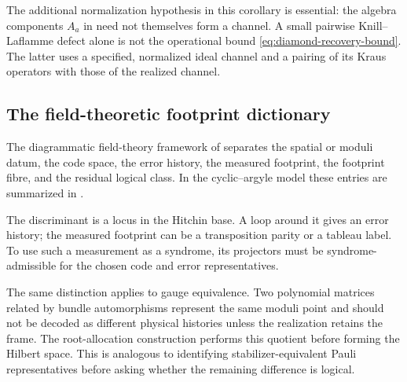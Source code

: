 \documentclass[11pt]{article}
\theoremstyle{definition}
\theoremstyle{remark}
\begin{document}
The additional normalization hypothesis in this corollary is essential: the algebra components $A_a$ in  need not themselves form a channel.  A small pairwise Knill--Laflamme defect alone is not the operational bound \eqref{eq:diamond-recovery-bound}.  The latter uses a specified, normalized ideal channel and a pairing of its Kraus operators with those of the realized channel.

\subsection{The field-theoretic footprint dictionary}\label{sec:dictionary}

The diagrammatic field-theory framework of \cite{RayanDiagrammatic2026} separates the spatial or moduli datum, the code space, the error history, the measured footprint, the footprint fibre, and the residual logical class.  In the cyclic--argyle model these entries are summarized in .

The discriminant is a locus in the Hitchin base.  A loop around it gives an error history; the measured footprint can be a transposition parity or a tableau label.  To use such a measurement as a syndrome, its projectors must be syndrome-admissible for the chosen code and error representatives.

The same distinction applies to gauge equivalence.  Two polynomial matrices related by bundle automorphisms represent the same moduli point and should not be decoded as different physical histories unless the realization retains the frame.  The root-allocation construction performs this quotient before forming the Hilbert space.  This is analogous to identifying stabilizer-equivalent Pauli representatives before asking whether the remaining difference is logical.
\end{document}
